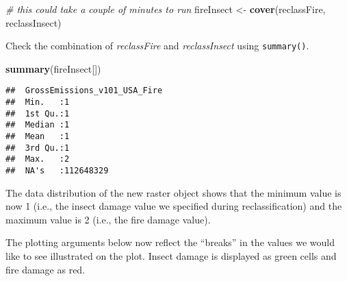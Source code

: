 \documentclass[
]{article}
\newenvironment{Shaded}{\begin{snugshade}}{\end{snugshade}}
\newcommand{\AttributeTok}[1]{\textcolor[rgb]{0.13,0.29,0.53}{#1}}
\newcommand{\CommentTok}[1]{\textcolor[rgb]{0.56,0.35,0.01}{\textit{#1}}}
\newcommand{\ConstantTok}[1]{\textcolor[rgb]{0.56,0.35,0.01}{#1}}
\newcommand{\FloatTok}[1]{\textcolor[rgb]{0.00,0.00,0.81}{#1}}
\newcommand{\FunctionTok}[1]{\textcolor[rgb]{0.13,0.29,0.53}{\textbf{#1}}}
\newcommand{\NormalTok}[1]{#1}
\newcommand{\OtherTok}[1]{\textcolor[rgb]{0.56,0.35,0.01}{#1}}
\newcommand{\SpecialCharTok}[1]{\textcolor[rgb]{0.81,0.36,0.00}{\textbf{#1}}}
\newcommand{\StringTok}[1]{\textcolor[rgb]{0.31,0.60,0.02}{#1}}
\begin{document}
\begin{Shaded}
\begin{Highlighting}[]
\CommentTok{\# this could take a couple of minutes to run }
\NormalTok{fireInsect }\OtherTok{\textless{}{-}} \FunctionTok{cover}\NormalTok{(reclassFire, reclassInsect) }
\end{Highlighting}
\end{Shaded}

Check the combination of \emph{reclassFire} and \emph{reclassInsect}
using \texttt{summary()}.

\begin{Shaded}
\begin{Highlighting}[]
\FunctionTok{summary}\NormalTok{(fireInsect[]) }
\end{Highlighting}
\end{Shaded}

\begin{verbatim}
##  GrossEmissions_v101_USA_Fire
##  Min.   :1                   
##  1st Qu.:1                   
##  Median :1                   
##  Mean   :1                   
##  3rd Qu.:1                   
##  Max.   :2                   
##  NA's   :112648329
\end{verbatim}

The data distribution of the new raster object shows that the minimum
value is now 1 (i.e., the insect damage value we specified during
reclassification) and the maximum value is 2 (i.e., the fire damage
value).

The plotting arguments below now reflect the ``breaks'' in the values we
would like to see illustrated on the plot. Insect damage is displayed as
green cells and fire damage as red.

\begin{Shaded}
\end{Shaded}
\end{document}
